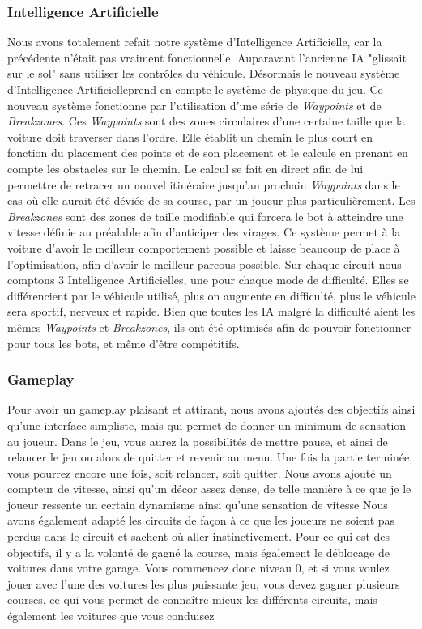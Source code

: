 \documentclass[a4paper,12pt]{article}
\newcommand{\AI}{Intelligence Artificielle}
\begin{document}
            \subsubsection{\AI}
            
            Nous avons totalement refait notre système d'\AI, car la précédente n'était pas vraiment fonctionnelle. Auparavant l'ancienne IA "glissait sur le sol" sans utiliser les contrôles du véhicule. Désormais le nouveau système d'\AI prend en compte le système de physique du jeu. Ce nouveau système fonctionne par l'utilisation d'une série de \textsl{Waypoints} et de \textsl{Breakzones}. Ces \textsl{Waypoints} sont des zones circulaires d'une certaine taille que la voiture doit traverser dans l'ordre. Elle établit un chemin le plus court en fonction du placement des points et de son placement et le calcule en prenant en compte les obstacles sur le chemin. Le calcul se fait en direct afin de lui permettre de retracer un nouvel itinéraire jusqu'au prochain \textsl{Waypoints} dans le cas où elle aurait été déviée de sa course, par un joueur plus particulièrement. Les \textsl{Breakzones} sont des zones de taille modifiable qui forcera le bot à atteindre une vitesse définie au préalable afin d'anticiper des virages. Ce système permet à la voiture d'avoir le meilleur comportement possible et laisse beaucoup de place à l'optimisation, afin d'avoir le meilleur parcous possible. Sur chaque circuit nous comptons 3 {\AI}s, une pour chaque mode de difficulté. Elles se différencient par le véhicule utilisé, plus on augmente en difficulté, plus le véhicule sera sportif, nerveux et rapide. Bien que toutes les IA malgré la difficulté aient les mêmes \textsl{Waypoints} et \textsl{Breakzones}, ils ont été optimisés afin de pouvoir fonctionner pour tous les bots, et même d'être compétitifs.
            
            \subsubsection{Gameplay}
            
            Pour avoir un gameplay plaisant et attirant, nous avons ajoutés des objectifs ainsi qu'une interface simpliste, mais qui permet de donner un minimum de sensation au joueur. Dans le jeu, vous aurez la possibilités de mettre pause, et ainsi de relancer le jeu ou alors de quitter et revenir au menu. Une fois la partie terminée, vous pourrez encore une fois, soit relancer, soit quitter. Nous avons ajouté un compteur de vitesse, ainsi qu'un décor assez dense, de telle manière à ce que je le joueur ressente un certain dynamisme ainsi qu'une sensation de vitesse Nous avons également adapté les circuits de façon à ce que les joueurs ne soient pas perdus dans le circuit et sachent où aller instinctivement. Pour ce qui est des objectifs, il y a la volonté de gagné la course, mais également le déblocage de voitures dans votre garage. Vous commencez donc niveau 0, et si vous voulez jouer avec l'une des voitures les plus puissante jeu, vous devez gagner plusieurs courses, ce qui vous permet de connaître mieux les différents circuits, mais également les voitures que vous conduisez   
            
\end{document}
